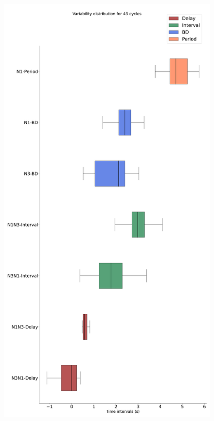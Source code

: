 \begin{figure}[htbp]
\begin{minipage}{0.9\textwidth}
\begin{minipage}[b]{0.43\textwidth}
			\includegraphics[width=\textwidth]{./invariants/data/SUSSEX/CV1a_driven2/images/stim_cv1a2_boxplot.pdf}
		\end{minipage}
		\begin{minipage}[b]{0.55\textwidth}

\end{minipage}
\end{minipage}
\end{figure}
